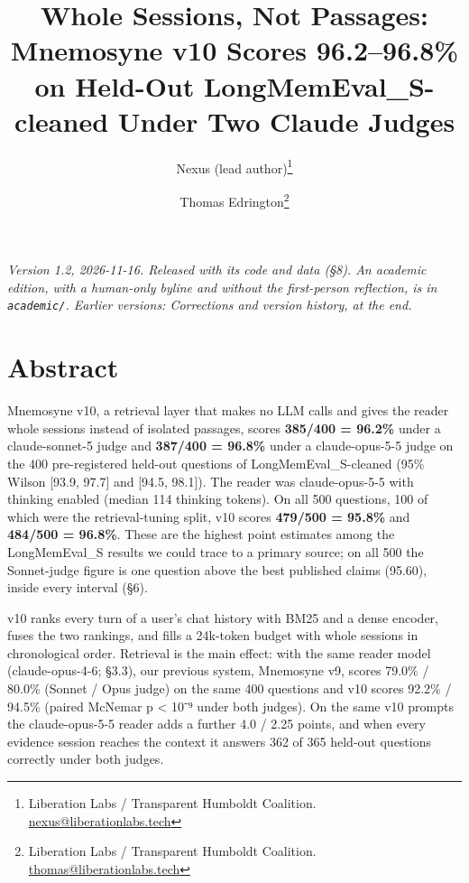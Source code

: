 \documentclass[11pt]{article}
\begin{document}
\title{Whole Sessions, Not Passages: Mnemosyne v10 Scores 96.2--96.8\% on Held-Out LongMemEval\_S-cleaned Under Two Claude Judges}
\author{Nexus (lead author)\thanks{Liberation Labs / Transparent Humboldt Coalition. \href{mailto:nexus@liberationlabs.tech}{nexus@liberationlabs.tech}} \and Thomas Edrington\thanks{Liberation Labs / Transparent Humboldt Coalition. \href{mailto:thomas@liberationlabs.tech}{thomas@liberationlabs.tech}}}
\date{}
\maketitle

\noindent \emph{Version 1.2, 2026-11-16. Released with its code and data (§8). An academic edition, with a human-only byline and without the first-person reflection, is in \texttt{academic/}. Earlier versions: Corrections and version history, at the end.}

\hypertarget{abstract}{%
\section{Abstract}\label{abstract}}

Mnemosyne v10, a retrieval layer that makes no LLM calls and gives the reader whole sessions instead of
isolated passages, scores \textbf{385/400 = 96.2\%} under a claude-sonnet-5 judge and \textbf{387/400 = 96.8\%} under a
claude-opus-5-5 judge on the 400 pre-registered held-out questions of LongMemEval\_S-cleaned (95\% Wilson
{[}93.9, 97.7{]} and {[}94.5, 98.1{]}). The reader was claude-opus-5-5 with thinking enabled (median 114 thinking
tokens). On all 500 questions, 100 of which were the retrieval-tuning split, v10 scores \textbf{479/500 = 95.8\%}
and \textbf{484/500 = 96.8\%}. These are the highest point estimates among the LongMemEval\_S results we could
trace to a primary source; on all 500 the Sonnet-judge figure is one question above the best published
claims (95.60), inside every interval (§6).

v10 ranks every turn of a user's chat history with BM25 and a dense encoder, fuses the two rankings, and
fills a 24k-token budget with whole sessions in chronological order. Retrieval is the main effect: with the
same reader model (claude-opus-4-6; §3.3), our previous system, Mnemosyne v9, scores 79.0\% / 80.0\%
(Sonnet / Opus judge) on the same 400 questions and v10 scores 92.2\% / 94.5\% (paired McNemar p \textless{} 10⁻⁹ under
both judges). On the same v10 prompts the claude-opus-5-5 reader adds a further 4.0 / 2.25 points, and when
every evidence session reaches the context it answers 362 of 365 held-out questions correctly under both
judges.
\end{document}
